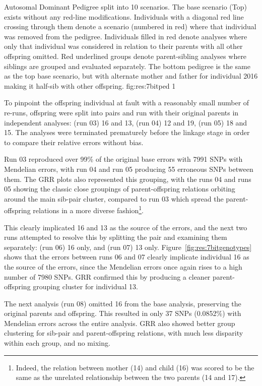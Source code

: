 {Autosomal Dominant Pedigree split into 10 scenarios. The base scenario (Top) exists without any red-line modifications. Individuals with a diagonal red line crossing through them denote a scenario (numbered in red) where that individual was removed from the pedigree. Individuals filled in red denote analyses where only that individual was considered in relation to their parents with all other offspring omitted. Red underlined groups denote parent-sibling analyses where siblings are grouped and evaluated separately. The bottom pedigree is the same as the top base scenario, but with alternate mother and father  for individual 2016 making it half-sib with other offspring.}
{fig:res:7bitped}
{1}
{}

\pagebreak
To pinpoint the offspring individual at fault with a reasonably small number of re-runs, offspring were split into pairs and run with their original parents in independent analyses: (run 03) 16 and 13, (run 04) 12 and 19, (run 05) 18 and 15. The analyses were terminated prematurely before the linkage stage in order to compare their relative errors without bias.

Run 03 reproduced over 99\% of the original base errors with 7991 SNPs with Mendelian errors, with run 04 and run 05 producing 55 erroneous SNPs between them. The GRR plots also represented this grouping, with the runs 04 and runs 05 showing the classic close groupings of parent-offspring relations orbiting around the main sib-pair cluster, compared to run 03 which spread the parent-offspring relations in a more diverse fashion\footnote{Indeed, the relation between mother (14) and child (16) was scored to be the same as the unrelated relationship between the two parents (14 and 17).}.

This clearly implicated 16 and 13 as the source of the errors, and the next two runs attempted to resolve this by splitting the pair and examining them separately: (run 06) 16 only, and (run 07) 13 only. Figure~\ref{fig:res:7bitgenotypes} shows that the errors between runs 06 and 07 clearly implicate individual 16 as the source of the errors, since the Mendelian errors once again rises to a high number of 7980 SNPs.  GRR confirmed this by producing a cleaner parent-offspring grouping cluster for individual 13.

The next analysis (run 08) omitted 16 from the base analysis, preserving the original parents and offspring. This resulted in only 37 SNPs (0.0852\%) with Mendelian errors across the entire analysis. GRR also showed better group clustering for sib-pair and parent-offspring relations, with much less disparity within each group, and no mixing.


